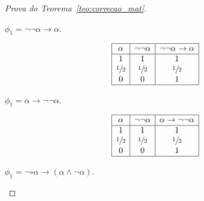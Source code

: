\begin{proof}[Prova do Teorema~\ref{teo:correcao_mat}]
\begin{provaporcasos}
\begin{provaporsubcasos}
                  
                \subcasodeprova{} $\phi_{1} = \neg \neg \alpha \to \alpha$. 

                \begin{center}
                    \[
                        \begin{array}{|c|c|c|}%
                            \hline
                            \alpha      & \neg \neg \alpha & \neg \neg \alpha \to \alpha \\
                            \hline%
                            1 & 1 & 1\\
                            \meio{} & \meio{} & \meio{}\\
                            0 & 0 & 1\\
                            \hline
                        \end{array}
                    \]
                \end{center}
                    
                   
                \subcasodeprova{} $\phi_{1} = \alpha \to \neg \neg \alpha$. 
                
                \begin{center}
                    \[
                        \begin{array}{|c|c|c|}%
                            \hline
                            \alpha      & \neg \neg \alpha &  \alpha \to \neg \neg \alpha\\
                            \hline%
                            1 & 1 & 1\\
                            \meio{} & \meio{} & \meio{}\\
                            0 & 0 & 1\\
                            \hline
                        \end{array}
                    \]
                \end{center}
                
                   
                \subcasodeprova{} $\phi_{1} = \neg \circ \alpha \to (\alpha \land \neg \alpha)$. 


\end{provaporsubcasos}
\end{provaporcasos}
\end{proof}
